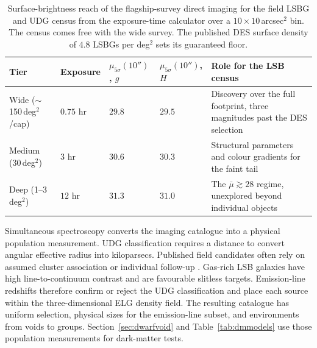 \begin{table}[htbp]
\centering
\sffamily\small
\setlength{\tabcolsep}{4pt}
\begin{tabularx}{\textwidth}{@{}p{2.9cm}p{1.7cm}p{2.35cm}p{2.35cm}X@{}}
\toprule
\textbf{Tier} & \textbf{Exposure} & \textbf{$\mu_{5\sigma}(10'')$, $g$} & \textbf{$\mu_{5\sigma}(10'')$, $H$} & \textbf{Role for the LSB census}\\
\midrule
Wide ($\sim$150\,deg$^2$/cap) & $0.75$ hr & $29.8$ & $29.5$ & Discovery over the full footprint, three magnitudes past the DES selection\\
Medium (30\,deg$^2$) & $3$ hr & $30.6$ & $30.3$ & Structural parameters and colour gradients for the faint tail\\
Deep (1--3\,deg$^2$) & $12$ hr & $31.3$ & $31.0$ & The $\bar\mu\gtrsim28$ regime, unexplored beyond individual objects\\
\bottomrule
\end{tabularx}
\caption{Surface-brightness reach of the flagship-survey direct imaging for the field LSBG and UDG census from the exposure-time calculator over a $10\times10$\,arcsec$^2$ bin. The census comes free with the wide survey. The published DES surface density of $4.8$ LSBGs per deg$^2$ \cite{tanoglidis2021} sets its guaranteed floor.}
\label{tab:lsbsurvey}
\end{table}

Simultaneous spectroscopy converts the imaging catalogue into a physical population measurement. UDG classification requires a distance to convert angular effective radius into kiloparsecs. Published field candidates often rely on assumed cluster association or individual follow-up \cite{zaritsky2023}. Gas-rich LSB galaxies have high line-to-continuum contrast and are favourable slitless targets. Emission-line redshifts therefore confirm or reject the UDG classification and place each source within the three-dimensional ELG density field. The resulting catalogue has uniform selection, physical sizes for the emission-line subset, and environments from voids to groups. Section~\ref{sec:dwarfvoid} and Table~\ref{tab:dmmodels} use those population measurements for dark-matter tests.

